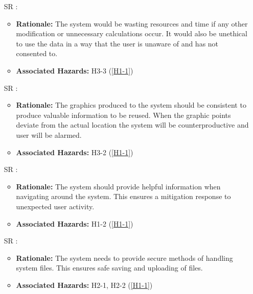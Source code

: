 \documentclass{article}
\newcounter{Sreqnum} %
\begin{document}
\begin{itemize}
\item[SR\refstepcounter{Sreqnum}\theSreqnum
\label{IR2}:] 
\begin{itemize}
    \item \textbf{Rationale:} The system would be wasting resources and time if any other modification or unnecessary calculations occur. It would also be unethical to use the data in a way that the user is unaware of and has not consented to. 
    \item \textbf{Associated Hazards: } H3-3 (\ref{H1-1})
\end{itemize}

\item[SR\refstepcounter{Sreqnum}\theSreqnum
\label{IR3}:] 
\begin{itemize}
    \item \textbf{Rationale:} The graphics produced to the system should be consistent to produce valuable information to be reused. When the graphic points deviate from the actual location the system will be counterproductive and user will be alarmed.  
    \item \textbf{Associated Hazards:} H3-2 (\ref{H1-1})
\end{itemize}

\item[SR\refstepcounter{Sreqnum}\theSreqnum
\label{IR4}:] 
\begin{itemize}
    \item \textbf{Rationale:} The system should provide helpful information when navigating around the system. This ensures a mitigation response to unexpected user activity.
    \item \textbf{Associated Hazards:}  H1-2 (\ref{H1-1})
\end{itemize}

\item[SR\refstepcounter{Sreqnum}\theSreqnum
\label{IR5}:] 
\begin{itemize}
    \item \textbf{Rationale:} The system needs to provide secure methods of handling system files. This ensures safe saving and uploading of files. 
    \item \textbf{Associated Hazards:} H2-1, H2-2 (\ref{H1-1})
\end{itemize}



\end{itemize}
\end{document}

